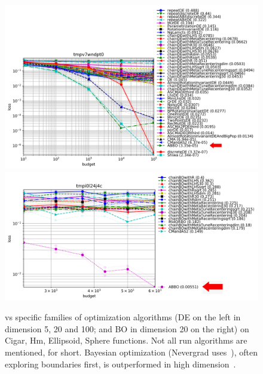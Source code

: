 \begin{figure}[ht]
    \centering
    \includegraphics[trim={0 0 0 150},clip,width=0.49\linewidth]{sections/appendix/h220benchmarks/benchmark/xp_alldes.png}
    \includegraphics[trim={0 0 0 45},clip,width=0.49\linewidth]{sections/appendix/h220benchmarks/benchmark/xp_hdbo4d.png}
    \caption{\ngoptq{} vs specific families of optimization algorithms {(DE on the left in dimension 5, 20 and 100; and BO in dimension 20 on the right) on Cigar, Hm, Ellipsoid, Sphere functions.} Not all run algorithms are mentioned, for short. {Bayesian optimization {(Nevergrad uses~\cite{BOpython})}, often exploring boundaries first, is outperformed in high dimension}~\cite{lamcts}.}
    \label{specif}
\end{figure}

